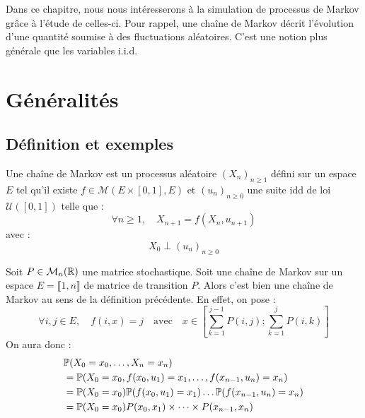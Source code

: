 \minitoc 



Dans ce chapitre, nous nous intéresserons à la simulation de processus de Markov grâce 
à l'étude de celles-ci. Pour rappel, une chaîne de Markov décrit l'évolution d'une quantité soumise à des 
fluctuations aléatoires. C'est une notion plus générale que les variables i.i.d. 


\section{Généralités}

\subsection{Définition et exemples}

\begin{definition}
    Une chaîne de Markov est un processus aléatoire $(X_n)_{n \geqslant 1}$ défini sur un espace $E$ 
    tel qu'il existe $ f \in \mathcal{M}(E \times [0,1], E)$ et $(u_n)_{n \geqslant 0}$ une suite idd de 
    loi $ \mathcal{U}([0,1])$ telle que : 
        $$ \boxed{\forall n \geqslant 1, \quad X_{n+1} = f(X_n, u_{n+1})} $$   
    avec : 
        $$ X_0 \perp (u_n)_{n \geqslant 0} $$
\end{definition}

\begin{example}
    Soit $P \in \mathcal{M}_n(\mathbb{R})$ une matrice stochastique. Soit une chaîne de Markov sur 
    un espace $E = \llbracket 1, n \rrbracket $ de matrice de transition $P$. 
    Alors c'est bien une chaîne de Markov au sens de la définition précédente. 
    En effet, on pose : 
        \[ \forall i, j \in E, \quad f(i,x) = j \quad \text{avec} \quad x \in \left[ \sum_{k=1}^{j-1} P(i,j); \sum_{k=1}^{j} P(i,k)\right]  \] 
    On aura donc : 
        \begin{align*}
            & \mathbb{P}(X_0 = x_0, \dots, X_n = x_n) \\
            &= \mathbb{P}(X_0 = x_0, f(x_0, u_1) = x_1, \dots, f(x_{n-1}, u_n) = x_n) \\
            &= \mathbb{P}(X_0 = x_0) \mathbb{P}(f(x_0, u_1) = x_1) \dots \mathbb{P}(f(x_{n-1}, u_n) = x_n) \\ 
            &= \mathbb{P}(X_0 = x_0) P(x_0, x_1) \times \dots \times P(x_{n-1}, x_n)       
        \end{align*}
\end{example}

